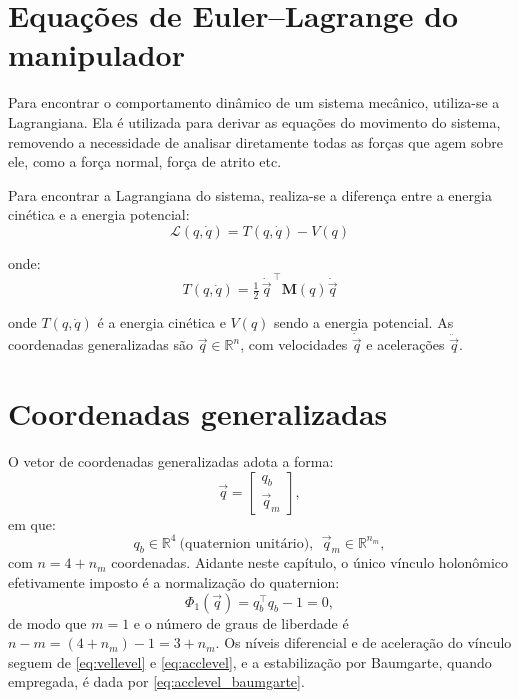 \section{Equações de Euler--Lagrange do manipulador}
\label{sec:equacao_euler_lagrange}
Para encontrar o comportamento dinâmico de um sistema mecânico, utiliza-se a Lagrangiana.
Ela é utilizada para derivar as equações do movimento do sistema, removendo a necessidade de analisar diretamente todas as forças que agem sobre ele, como a força normal, força de atrito etc.

Para encontrar a Lagrangiana do sistema, realiza-se a diferença entre a energia cinética e a energia potencial:
\begin{equation}
\mathcal{L}(q, \dot{q}) = T(q, \dot{q}) - V(q)
\end{equation}

onde:
\begin{equation}
    \label{eq:energia_cinetica_lagrangiana}
T(q, \dot{q})=
\tfrac12\,\dot{\vec q}^{\,\top}\mathbf M(q)\dot{\vec q}
\end{equation}

onde $T(q, \dot{q})$ é a energia cinética e $V(q)$ sendo a energia potencial.
As coordenadas generalizadas são $\vec q\in\mathbb R^n$, com velocidades
$\dot{\vec q}$ e acelerações $\ddot{\vec q}$.

\section{Coordenadas generalizadas}
O vetor de coordenadas generalizadas adota a forma:
\begin{equation}
\vec q
=
\begin{bmatrix} q_b \\[2pt] \vec q_m \end{bmatrix},
\end{equation}
em que:
\begin{equation}
q_b\in\mathbb R^4\ \text{(quaternion unitário)},\ \ 
\vec q_m\in\mathbb R^{n_m},
\end{equation}
com $n=4+n_m$ coordenadas.
Aidante neste capítulo, o único vínculo holonômico efetivamente imposto é a normalização do quaternion:
\begin{equation}
\Phi_1(\vec q)=q_b^{\top}q_b-1=0,
\end{equation}
de modo que $m=1$ e o número de graus de liberdade é $n-m = (4+n_m)-1 = 3+n_m$.  
Os níveis diferencial e de aceleração do vínculo seguem de \eqref{eq:vellevel} e \eqref{eq:acclevel},
e a estabilização por Baumgarte, quando empregada, é dada por \eqref{eq:acclevel_baumgarte}.



